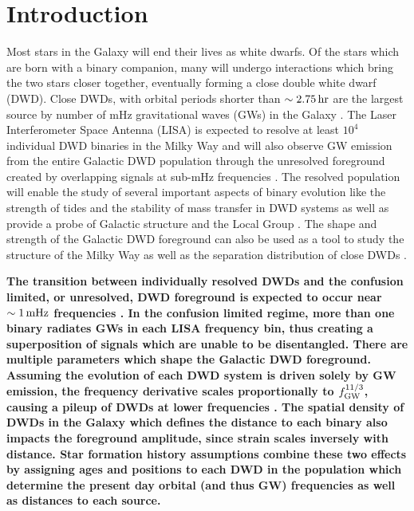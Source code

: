 \documentclass[twocolumn, linenumbers]{aastex631}
\begin{document}

\section{Introduction} \label{sec:intro}
Most stars in the Galaxy will end their lives as white dwarfs. Of the stars which are born with a binary companion, many will undergo interactions which bring the two stars closer together, eventually forming a close double white dwarf (DWD). Close DWDs, with orbital periods shorter than $\sim2.75\,\rm{hr}$ are the largest source by number of mHz gravitational waves (GWs) in the Galaxy \citep[e.g.,][]{LISAMissionProposal}. The Laser Interferometer Space Antenna (LISA) is expected to resolve at least $10^4$ individual DWD binaries in the Milky Way and will also observe GW emission from the entire Galactic DWD population through the unresolved foreground created by overlapping signals at sub-mHz frequencies \citep[e.g.,][]{Nelemans2001a, Ruiter2010, Nissanke2012, Yu2013, Korol2017, Lamberts2019, Breivik2020a}. The resolved population will enable the study of several important aspects of binary evolution like the strength of tides \citep{Valsecchi2012} and the stability of mass transfer in DWD systems \citep[e.g.,][]{Marsh2004, Shen2015, Gokhale2007, Sepinsky2014, Kremer2015} as well as provide a probe of Galactic structure \citep{Korol2019} and the Local Group \citep{Korol2018}. The shape and strength of the Galactic DWD foreground can also be used as a tool to study the structure of the Milky Way \citep{Benacquista2006, Breivik2020b} as well as the separation distribution of close DWDs \citep{Korol2021}.

\textbf{The transition between individually resolved DWDs and the confusion limited, or unresolved, DWD foreground is expected to occur near $\sim1\,\rm{mHz}$ frequencies \citep[e.g. ][]{Ruiter2010}. In the confusion limited regime, more than one binary radiates GWs in each LISA frequency bin, thus creating a superposition of signals which are unable to be disentangled. There are multiple parameters which shape the Galactic DWD foreground. Assuming the evolution of each DWD system is driven solely by GW emission, the frequency derivative scales proportionally to $f_{\rm{GW}}^{11/3}$, causing a pileup of DWDs at lower frequencies \citep{Breivik2019fg}. The spatial density of DWDs in the Galaxy  which defines the distance to each binary also impacts the foreground amplitude, since strain scales inversely with distance. Star formation history assumptions combine these two effects by assigning ages and positions to each DWD in the population which determine the present day orbital (and thus GW) frequencies as well as distances to each source.}
\end{document}
